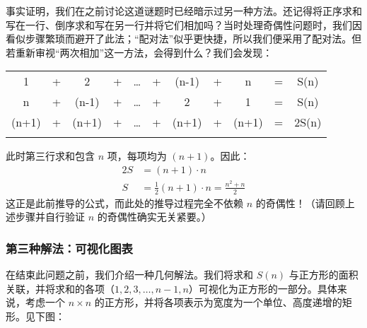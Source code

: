 事实证明，我们在之前讨论这道谜题时已经暗示过另一种方法。还记得将正序求和写在一行、倒序求和写在另一行并将它们相加吗？当时处理奇偶性问题时，我们因看似步骤繁琐而避开了此法；``配对法''似乎更快捷，所以我们便采用了配对法。但若重新审视``两次相加''这一方法，会得到什么？我们会发现：
\begin{center}
    \begin{tabular}{ccccccccccc}
           1  & + &     2 & + & \dots & + & (n-1) & + &     n & = & S(n)\\\noalign{\smallskip\smallskip}
           n  & + & (n-1) & + & \dots & + &     2 & + &     1 & = & S(n)\\\noalign{\smallskip\smallskip}
        \hline
        (n+1) & + & (n+1) & + & \dots & + & (n+1) & + & (n+1) & = & 2S(n)\\\noalign{\smallskip\smallskip}
    \end{tabular}
\end{center}
此时第三行求和包含 $n$ 项，每项均为 $(n + 1)$。因此：
\begin{align*}
    2S &= (n+1) \cdot n \\
     S &= \frac{1}{2}(n+1) \cdot n = \frac{n^2+n}{2}
\end{align*}
这正是此前推导的公式，而此处的推导过程完全不依赖 $n$ 的奇偶性！（请回顾上述步骤并自行验证 $n$ 的奇偶性确实无关紧要。）

\subsubsection*{第三种解法：可视化图表}

在结束此问题之前，我们介绍一种几何解法。我们将求和 $S(n)$ 与正方形的面积关联，并将求和的各项（$1, 2, 3, \dots, n - 1, n$）可视化为正方形的一部分。具体来说，考虑一个 $n \times n$ 的正方形，并将各项表示为宽度为一个单位、高度递增的矩形。见下图：

\begin{center}
\end{center}

